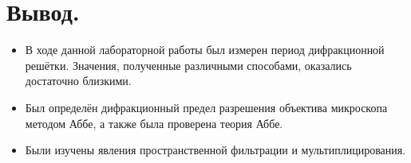 \documentclass[a4paper, 12pt, twoside]{article}
\begin{document}
	\section{Вывод.}

	\begin{itemize}
		\item В ходе данной лабораторной работы был измерен период дифракционной решётки. Значения, полученные различными способами, оказались достаточно близкими.
		
		\item Был определён дифракционный предел разрешения объектива микроскопа методом Аббе, а также была проверена теория Аббе.
		
		\item Были изучены явления пространственной фильтрации и мультиплицирования.
	\end{itemize}
	
\end{document}
